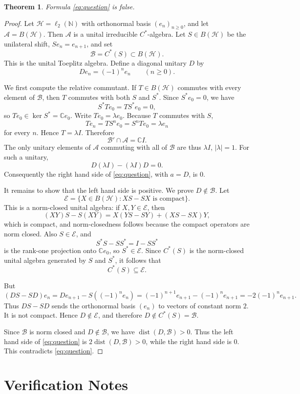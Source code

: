 \documentclass[11pt]{article}
\newtheorem{theorem}{Theorem}
\newcommand{\A}{\mathcal A}
\newcommand{\B}{\mathcal B}
\newcommand{\C}{\mathbb C}
\newcommand{\dist}{\operatorname{dist}}
\newcommand{\HH}{\mathcal H}
\newcommand{\N}{\mathbb N}
\begin{document}
\begin{theorem}
Formula \eqref{eq:question} is false.
\end{theorem}

\begin{proof}
Let $\HH=\ell_2(\N)$ with orthonormal basis $(e_n)_{n\geq 0}$, and let
$\A=B(\HH)$. Then $\A$ is a unital irreducible $C^*$-algebra. Let
$S\in B(\HH)$ be the unilateral shift, $Se_n=e_{n+1}$, and set
\[
  \B=C^*(S)\subset B(\HH).
\]
This is the unital Toeplitz algebra. Define a diagonal unitary $D$ by
\[
  D e_n = (-1)^n e_n \qquad (n\geq 0).
\]

We first compute the relative commutant. If $T\in B(\HH)$ commutes with every
element of $\B$, then $T$ commutes with both $S$ and $S^*$. Since
$S^*e_0=0$, we have
\[
  S^*T e_0 = T S^* e_0 =0,
\]
so $T e_0\in\ker S^*=\C e_0$. Write $T e_0=\lambda e_0$. Because $T$ commutes
with $S$,
\[
  T e_n = T S^n e_0 = S^n T e_0 = \lambda e_n
\]
for every $n$. Hence $T=\lambda I$. Therefore
\[
  \B'\cap \A = \C I.
\]
The only unitary elements of $\A$ commuting with all of $\B$ are thus
$\lambda I$, $|\lambda|=1$. For such a unitary,
\[
  D(\lambda I)-(\lambda I)D=0.
\]
Consequently the right hand side of \eqref{eq:question}, with $a=D$, is $0$.

It remains to show that the left hand side is positive. We prove $D\notin\B$.
Let
\[
  \mathcal E=\{X\in B(\HH): XS-SX \text{ is compact}\}.
\]
This is a norm-closed unital algebra: if $X,Y\in\mathcal E$, then
\[
  (XY)S-S(XY)=X(YS-SY)+(XS-SX)Y,
\]
which is compact, and norm-closedness follows because the compact operators
are norm closed. Also $S\in\mathcal E$, and
\[
  S^*S-SS^* = I-SS^*
\]
is the rank-one projection onto $\C e_0$, so $S^*\in\mathcal E$. Since
$C^*(S)$ is the norm-closed unital algebra generated by $S$ and $S^*$, it
follows that
\[
  C^*(S)\subseteq \mathcal E.
\]

But
\[
  (DS-SD)e_n = D e_{n+1}-S((-1)^n e_n)
  = (-1)^{n+1}e_{n+1}-(-1)^n e_{n+1}
  = -2(-1)^n e_{n+1}.
\]
Thus $DS-SD$ sends the orthonormal basis $(e_n)$ to vectors of constant norm
$2$. It is not compact. Hence $D\notin\mathcal E$, and therefore
$D\notin C^*(S)=\B$.

Since $\B$ is norm closed and $D\notin\B$, we have $\dist(D,\B)>0$. Thus the
left hand side of \eqref{eq:question} is $2\dist(D,\B)>0$, while the right
hand side is $0$. This contradicts \eqref{eq:question}.
\end{proof}

\section{Verification Notes}
\end{document}
